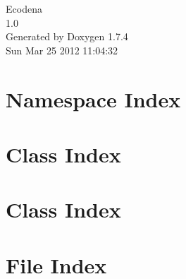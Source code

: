 \documentclass[a4paper]{book}
\begin{document}
\hypersetup{pageanchor=false}
\begin{titlepage}
\vspace*{7cm}
\begin{center}
{\Large Ecodena \\[1ex]\large 1.0 }\\
\vspace*{1cm}
{\large Generated by Doxygen 1.7.4}\\
\vspace*{0.5cm}
{\small Sun Mar 25 2012 11:04:32}\\
\end{center}
\end{titlepage}
\clearemptydoublepage
{}
\tableofcontents
\clearemptydoublepage
{}
\hypersetup{pageanchor=true}
\chapter{Namespace Index}

\chapter{Class Index}

\chapter{Class Index}

\chapter{File Index}

\end{document}
